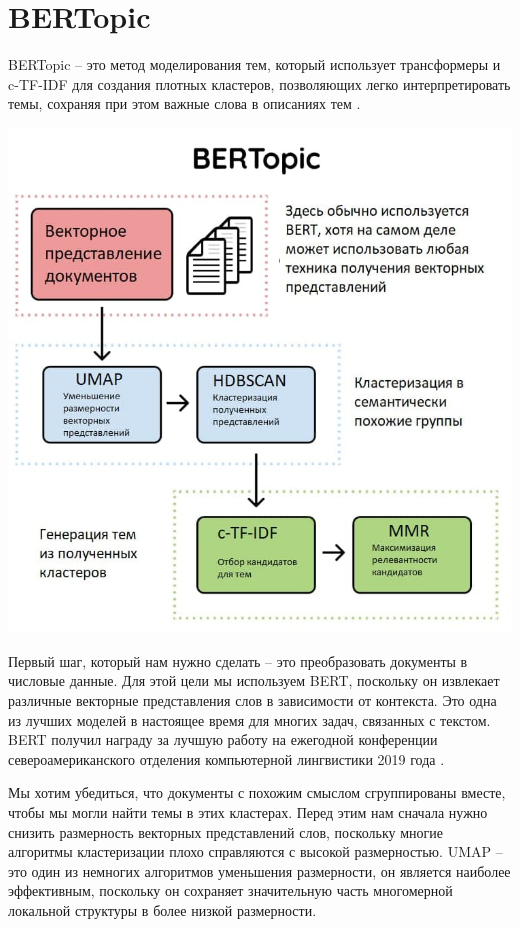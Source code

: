 \section{BERTopic}

BERTopic -- это метод моделирования тем, который использует трансформеры и c-TF-IDF для создания плотных кластеров, позволяющих легко интерпретировать темы, сохраняя при этом важные слова в описаниях тем \cite{bib234234}. 

\begin{center}
\includegraphics[scale=0.7]{pics/bertopic.jpg}
\end{center}

Первый шаг, который нам нужно сделать -- это преобразовать документы в числовые данные. Для этой цели мы используем BERT, поскольку он извлекает различные векторные представления слов в зависимости от контекста. Это одна из лучших моделей в настоящее время для многих задач, связанных с текстом. BERT получил награду за лучшую работу на ежегодной конференции североамериканского отделения  компьютерной лингвистики 2019 года \cite{bib_1} \cite{bib_2}.

Мы хотим убедиться, что документы с похожим смыслом сгруппированы вместе, чтобы мы могли найти темы в этих кластерах. Перед этим нам сначала нужно снизить размерность векторных представлений слов, поскольку многие алгоритмы кластеризации плохо справляются с высокой размерностью. 
UMAP -- это один из немногих алгоритмов уменьшения размерности, он является наиболее эффективным,
 поскольку он сохраняет значительную часть многомерной локальной структуры в более низкой размерности. 



